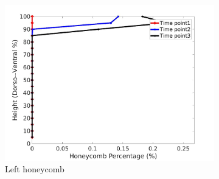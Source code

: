 \begin{figure}[H]
\begin{subfigure}{.42\linewidth}
  \includegraphics[width=\linewidth,trim={{.0\wd0} {.0\wd0} {.0\wd0} {.0\wd0}},clip]{Appendix/Image_AppexA/DorsoToVentral/IPF5LeftLungHoneycombDiseaseDorsoToVentral.jpg} %
  \caption{Left honeycomb}
  \label{fig:IPF5DiseaseDorsoToVentral-e} 
\end{subfigure} 
\begin{subfigure}{.42\linewidth}%

\end{subfigure}
\end{figure}
